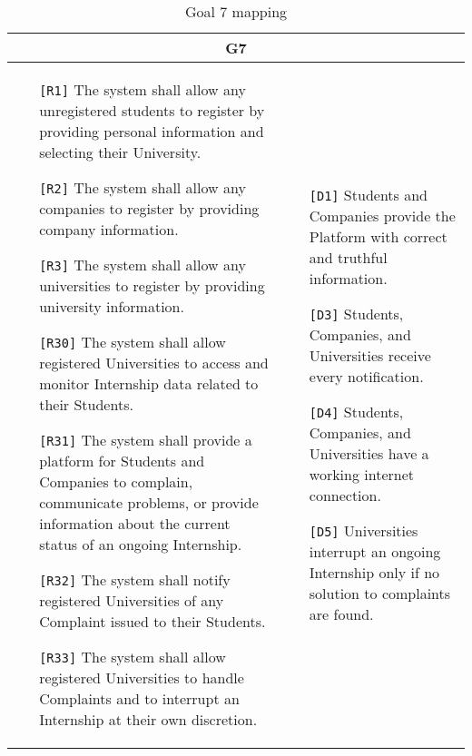 \begin{table}[H]
 \centering
 \begin{tabular}{|p{8cm}|p{8cm}|}
  \hline
  \multicolumn{2}{|c|}{G7} \\
  \hline
  \begin{itemize}
   \item[\texttt{[R1]}] The system shall allow any unregistered students to register by providing personal information and selecting their University.
   \item[\texttt{[R2]}] The system shall allow any companies to register by providing company information.
   \item[\texttt{[R3]}] The system shall allow any universities to register by providing university information.
   \item[\texttt{[R30]}] The system shall allow registered Universities to access and monitor Internship data related to their Students.
   \item[\texttt{[R31]}] The system shall provide a platform for Students and Companies to complain, communicate problems, or provide information about the current status of an ongoing Internship.
   \item[\texttt{[R32]}] The system shall notify registered Universities of any Complaint issued to their Students.
   \item[\texttt{[R33]}] The system shall allow registered Universities to handle Complaints and to interrupt an Internship at their own discretion.
  \end{itemize} &
  \begin{itemize}
   \item[\texttt{[D1]}] Students and Companies provide the Platform with correct and truthful information.
   \item[\texttt{[D3]}] Students, Companies, and Universities receive every notification.
   \item[\texttt{[D4]}] Students, Companies, and Universities have a working internet connection.
   \item[\texttt{[D5]}] Universities interrupt an ongoing Internship only if no solution to complaints are found.
  \end{itemize} \\ \hline
 \end{tabular}
 \caption{Goal 7 mapping}
 \label{tab:G7}
\end{table}


